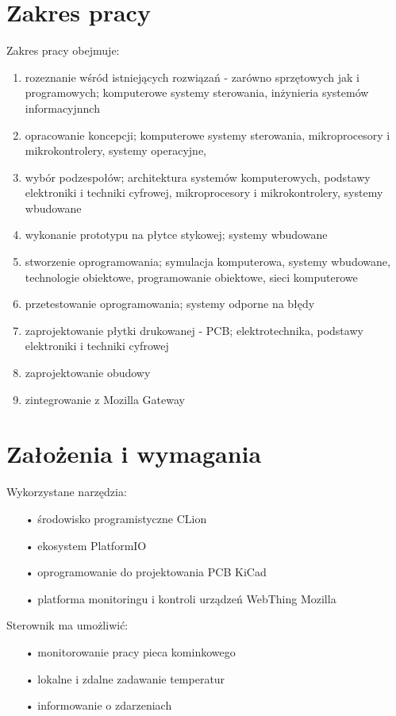 \documentclass[11pt,a4paper]{report}
\begin{document}
 \section{Zakres pracy}
 Zakres pracy obejmuje:
 \begin{enumerate}
 \item rozeznanie wśród istniejących rozwiązań - zarówno sprzętowych jak i programowych; komputerowe systemy sterowania, inżynieria systemów informacyjnnch
 \item opracowanie koncepcji; komputerowe systemy sterowania, mikroprocesory i mikrokontrolery, systemy operacyjne, 
 \item wybór podzespołów; architektura systemów komputerowych, podstawy elektroniki i techniki cyfrowej, mikroprocesory i mikrokontrolery, systemy wbudowane
 \item wykonanie prototypu na płytce stykowej; systemy wbudowane
 \item stworzenie oprogramowania; symulacja komputerowa, systemy wbudowane, technologie obiektowe, programowanie obiektowe, sieci komputerowe
 \item przetestowanie oprogramowania; systemy odporne na błędy
 \item zaprojektowanie płytki drukowanej - PCB; elektrotechnika, podstawy elektroniki i techniki cyfrowej
 \item zaprojektowanie obudowy
 \item zintegrowanie z Mozilla Gateway
 \end{enumerate}
 
 \section{Założenia i wymagania}
 
 Wykorzystane narzędzia:
 \begin{enumerate}
 \item[•] środowisko programistyczne CLion
 \item[•] ekosystem PlatformIO
 \item[•] oprogramowanie do projektowania PCB KiCad
 \item[•] platforma monitoringu i kontroli urządzeń WebThing Mozilla
 \end{enumerate}
 
 Sterownik ma umożliwić:
 \begin{enumerate}
 \item[•] monitorowanie pracy pieca kominkowego
 \item[•] lokalne i zdalne zadawanie temperatur
 \item[•] informowanie o zdarzeniach
 \end{enumerate}
 
\end{document}
